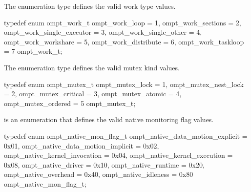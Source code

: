 \label{sec:ompt_work_t}

\summary
The  enumeration type defines the valid work type values.

\format
\begin{ccppspecific}
\begin{omptEnum}
typedef enum ompt_work_t {
  ompt_work_loop               = 1,
  ompt_work_sections           = 2,
  ompt_work_single_executor    = 3,
  ompt_work_single_other       = 4,
  ompt_work_workshare          = 5,
  ompt_work_distribute         = 6,
  ompt_work_taskloop           = 7
} ompt_work_t;
\end{omptEnum}
\end{ccppspecific}



\label{sec:ompt_mutex_t}

\summary
The  enumeration type defines the valid mutex kind values.

\format
\begin{ccppspecific}
\begin{omptEnum}
typedef enum ompt_mutex_t {
  ompt_mutex_lock                     = 1,
  ompt_mutex_nest_lock                = 2,
  ompt_mutex_critical                 = 3,
  ompt_mutex_atomic                   = 4,
  ompt_mutex_ordered                  = 5
} ompt_mutex_t;
\end{omptEnum}
\end{ccppspecific}





\label{sec:ompt_native_mon_flag_t}
 is an enumeration that defines the valid native monitoring flag values.


\begin{ccppspecific}
\begin{omptEnum}
typedef enum ompt_native_mon_flag_t {
  ompt_native_data_motion_explicit    = 0x01,
  ompt_native_data_motion_implicit    = 0x02,
  ompt_native_kernel_invocation       = 0x04,
  ompt_native_kernel_execution        = 0x08,
  ompt_native_driver                  = 0x10,
  ompt_native_runtime                 = 0x20,
  ompt_native_overhead                = 0x40,
  ompt_native_idleness                = 0x80
} ompt_native_mon_flag_t;
\end{omptEnum}
\end{ccppspecific}




